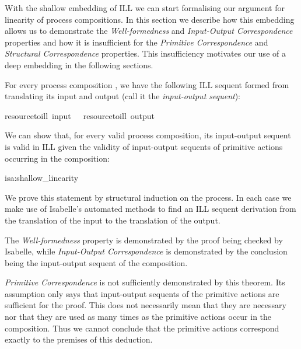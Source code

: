 \documentclass[class=smolathesis,crop=false]{standalone}
\begin{document}
With the shallow embedding of ILL we can start formalising our argument for linearity of process compositions.
In this section we describe how this embedding allows us to demonstrate the \emph{Well-formedness} and \emph{Input-Output Correspondence} properties and how it is insufficient for the \emph{Primitive Correspondence} and \emph{Structural Correspondence} properties.
This insufficiency motivates our use of a deep embedding in the following sections.

For every process composition , we have the following ILL sequent formed from translating its input and output (call it the \emph{input-output sequent}):
\begin{isabelle}
\centering
  {\isacharbrackleft}resource{\isacharunderscore}to{\isacharunderscore}ill\ {\isacharparenleft}input\ \ {\isasymturnstile}\ resource{\isacharunderscore}to{\isacharunderscore}ill\ {\isacharparenleft}output\ 
\end{isabelle}
We can show that, for every valid process composition, its input-output sequent is valid in ILL given the validity of input-output sequents of primitive actions occurring in the composition:
\begin{isalemma}{isa:shallow_linearity}
  
\end{isalemma}
We prove this statement by structural induction on the process.
In each case we make use of Isabelle's automated methods to find an ILL sequent derivation from the translation of the input to the translation of the output.

The \emph{Well-formedness} property is demonstrated by the proof being checked by Isabelle, while \emph{Input-Output Correspondence} is demonstrated by the conclusion being the input-output sequent of the composition.

\emph{Primitive Correspondence} is not sufficiently demonstrated by this theorem.
Its assumption only says that input-output sequents of the primitive actions are sufficient for the proof.
This does not necessarily mean that they are necessary nor that they are used as many times as the primitive actions occur in the composition.
Thus we cannot conclude that the primitive actions correspond exactly to the premises of this deduction.
\end{document}
